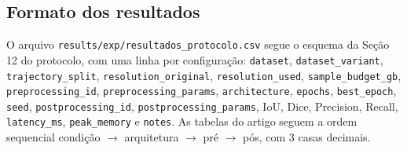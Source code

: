 \subsection{Formato dos resultados}
O arquivo \texttt{results/exp/resultados\_protocolo.csv} segue o esquema da Seção 12 do protocolo,
com uma linha por configuração: \texttt{dataset}, \texttt{dataset\_variant},
\texttt{trajectory\_split}, \texttt{resolution\_original}, \texttt{resolution\_used},
\texttt{sample\_budget\_gb}, \texttt{preprocessing\_id}, \texttt{preprocessing\_params},
\texttt{architecture}, \texttt{epochs}, \texttt{best\_epoch}, \texttt{seed},
\texttt{postprocessing\_id}, \texttt{postprocessing\_params}, IoU, Dice, Precision, Recall,
\texttt{latency\_ms}, \texttt{peak\_memory} e \texttt{notes}. As tabelas do artigo seguem a ordem
sequencial condição $\to$ arquitetura $\to$ pré $\to$ pós, com 3 casas decimais.
